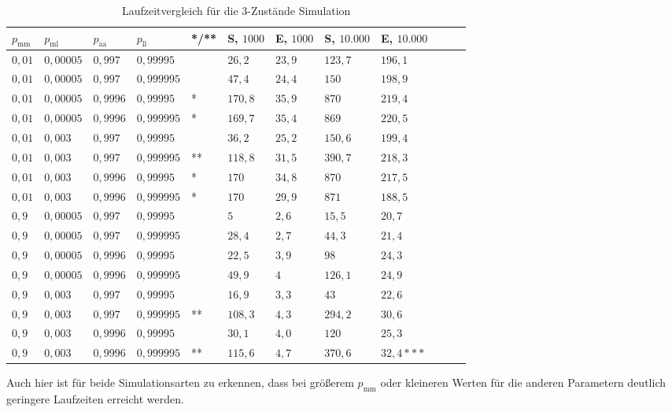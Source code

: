 \begin{table}[h]
\centering 
\caption{Laufzeitvergleich für die 3-Zustände Simulation}
\label{3s_laufzeit}
\begin{tabular}{|l|l|l|l|l|l|l|l|l|l|l|l|}
\hline
$p_\text{mm}$ & $p_\text{ml}$ & $p_\text{aa}$ & $p_\text{ll}$ &*/**& S, $1000$ & E, $1000$ & S, $10.000$ & E, $10.000$ \\ \hline \hline
$ 0,01 $ & $0,00005$ & $0,997$  & $0,99995$  && $26,2   $ & $23,9  $ & $123,7 $ & $196,1 $  \\ \hline
$ 0,01 $ & $0,00005$ & $0,997$  & $0,999995$ && $47,4   $ & $24,4  $ & $150   $ & $198,9 $  \\ \hline
$ 0,01 $ & $0,00005$ & $0,9996$ & $0,99995$  &*& $170,8 $ & $35,9  $ & $870   $ & $219,4 $  \\ \hline
$ 0,01 $ & $0,00005$ & $0,9996$ & $0,999995$ &*& $169,7 $ & $35,4  $ & $869   $ & $220,5 $  \\ \hline
$ 0,01 $ & $0,003 $  & $0,997$  & $0,99995$  && $36,2   $ & $25,2  $ & $150,6 $ & $199,4 $  \\ \hline
$ 0,01 $ & $0,003 $  & $0,997$  & $0,999995$ &**& $118,8$ & $31,5  $ & $390,7 $ & $218,3 $  \\ \hline
$ 0,01 $ & $0,003 $  & $0,9996$ & $0,99995$  &*& $170   $ & $34,8  $ & $870   $ & $217,5 $  \\ \hline
$ 0,01 $ & $0,003 $  & $0,9996$ & $0,999995$ &*& $170   $ & $29,9  $ & $871   $ & $188,5 $  \\ \hline
$ 0,9  $ & $0,00005$ & $0,997$  & $0,99995$  && $5      $ & $2,6 $   & $15,5  $ & $20,7 $  \\ \hline
$ 0,9  $ & $0,00005$ & $0,997$  & $0,999995$ && $28,4   $ & $2,7 $   & $44,3  $ & $21,4 $  \\ \hline
$ 0,9  $ & $0,00005$ & $0,9996$ & $0,99995$  && $22,5   $ & $3,9 $   & $98    $ & $24,3 $  \\ \hline
$ 0,9  $ & $0,00005$ & $0,9996$ & $0,999995$ && $49,9   $ & $4 $     & $126,1 $ & $24,9 $  \\ \hline
$ 0,9  $ & $0,003 $  & $0,997$  & $0,99995$  && $16,9   $ & $3,3 $   & $43    $ & $22,6 $  \\ \hline
$ 0,9  $ & $0,003 $  & $0,997$  & $0,999995$ &**& $108,3$ & $4,3   $ & $294,2 $ & $30,6 $  \\ \hline
$ 0,9  $ & $0,003 $  & $0,9996$ & $0,99995$  && $30,1   $ & $4,0 $   & $120 $   & $25,3 $  \\ \hline
$ 0,9  $ & $0,003 $  & $0,9996$ & $0,999995$ &**& $115,6$ & $4,7   $ & $370,6 $ & $32,4*** $  \\ \hline
\end{tabular}
\end{table}
Auch hier ist für beide Simulationsarten zu erkennen, dass bei größerem $p_\text{mm}$ oder kleineren Werten für die anderen Parametern deutlich geringere Laufzeiten erreicht werden.

